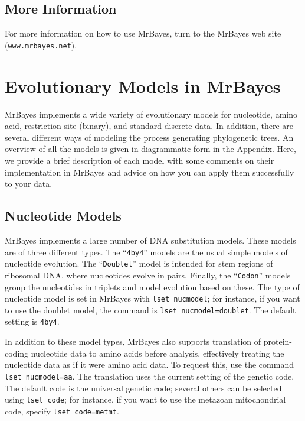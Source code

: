 \documentclass[12pt]{book}
\begin{document}
\section{More Information}

For more information on how to use MrBayes, turn to the MrBayes web site
(\texttt{www.mrbayes.net}).

\chapter{Evolutionary Models in MrBayes}\label{evolutionaryModels}

MrBayes implements a wide variety of evolutionary models for nucleotide, amino acid, restriction
site (binary), and standard discrete data. In addition, there are several different ways of
modeling the process generating phylogenetic trees. An overview of all the models is given in
diagrammatic form in the Appendix. Here, we provide a brief description of each model with some
comments on their implementation in MrBayes and advice on how you can apply them successfully to
your data.

\section{Nucleotide Models}

MrBayes implements a large number of DNA substitution models. These models are of three different
types. The ``\texttt{4by4}'' models are the usual simple models of nucleotide evolution. The
``\texttt{Doublet}'' model is intended for stem regions of ribosomal DNA, where nucleotides evolve
in pairs. Finally, the ``\texttt{Codon}'' models group the nucleotides in triplets and model
evolution based on these. The type of nucleotide model is set in MrBayes with \texttt{lset
nucmodel}; for instance, if you want to use the doublet model, the command is \texttt{lset
nucmodel=doublet}. The default setting is \texttt{4by4}.

In addition to these model types, MrBayes also supports translation of protein-coding nucleotide
data to amino acids before analysis, effectively treating the nucleotide data as if it were amino
acid data. To request this, use the command \texttt{lset nucmodel=aa}. The translation uses the
current setting of the genetic code. The default code is the universal genetic code; several others
can be selected using \texttt{lset code}; for instance, if you want to use the metazoan
mitochondrial code, specify \texttt{lset code=metmt}.
\end{document}
